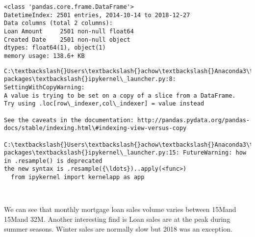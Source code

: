 \documentclass[11pt]{article}
\begin{document}
    \begin{Verbatim}[commandchars=\\\{\}]
<class 'pandas.core.frame.DataFrame'>
DatetimeIndex: 2501 entries, 2014-10-14 to 2018-12-27
Data columns (total 2 columns):
Loan Amount     2501 non-null float64
Created Date    2501 non-null object
dtypes: float64(1), object(1)
memory usage: 138.6+ KB

    \end{Verbatim}

    \begin{Verbatim}[commandchars=\\\{\}]
C:\textbackslash{}Users\textbackslash{}achow\textbackslash{}Anaconda3\textbackslash{}lib\textbackslash{}site-packages\textbackslash{}ipykernel\_launcher.py:8: SettingWithCopyWarning: 
A value is trying to be set on a copy of a slice from a DataFrame.
Try using .loc[row\_indexer,col\_indexer] = value instead

See the caveats in the documentation: http://pandas.pydata.org/pandas-docs/stable/indexing.html\#indexing-view-versus-copy
  
C:\textbackslash{}Users\textbackslash{}achow\textbackslash{}Anaconda3\textbackslash{}lib\textbackslash{}site-packages\textbackslash{}ipykernel\_launcher.py:15: FutureWarning: how in .resample() is deprecated
the new syntax is .resample({\ldots})..apply(<func>)
  from ipykernel import kernelapp as app

    \end{Verbatim}

    \begin{center}
    \end{center}
    { \hspace*{\fill} \\}
    
    We can see that monthly mortgage loan sales volume varies between 15Mand
15Mand 32M. Another interesting find is Loan sales are at the peak
during summer seasons. Winter sales are normally slow but 2018 was an
exception.
\end{document}
